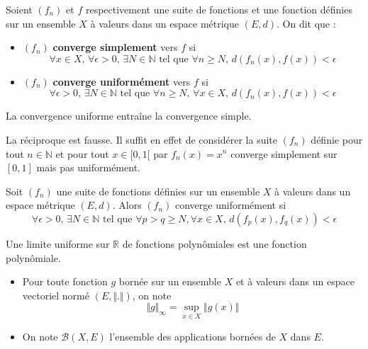   \begin{definition}
    Soient $(f_n)$ et $f$ respectivement une suite de fonctions et une fonction définies sur un ensemble $X$ à valeurs dans un espace métrique $(E, d)$. On dit que :
    \begin{itemize}
      \item $(f_n)$ \textbf{converge simplement} vers $f$ si
      \[ \forall x \in X, \, \forall \epsilon > 0, \, \exists N \in \mathbb{N} \text{ tel que } \forall n \geq N, \, d(f_n(x), f(x)) < \epsilon \]
      \item $(f_n)$ \textbf{converge uniformément} vers $f$ si
      \[ \forall \epsilon > 0, \, \exists N \in \mathbb{N} \text{ tel que } \forall n \geq N, \, \forall x \in X, \, d(f_n(x), f(x)) < \epsilon \]
    \end{itemize}
  \end{definition}

  \begin{proposition}
    La convergence uniforme entraîne la convergence simple.
  \end{proposition}

  \begin{cexample}
    La réciproque est fausse. Il suffit en effet de considérer la suite $(f_n)$ définie pour tout $n \in \mathbb{N}$ et pour tout $x \in [0,1[$ par $f_n(x) = x^n$ converge simplement sur $[0,1]$ mais pas uniformément.
  \end{cexample}

  \begin{theorem}
    Soit $(f_n)$ une suite de fonctions définies sur un ensemble $X$ à valeurs dans un espace métrique $(E, d)$. Alors $(f_n)$ converge uniformément si
    \[ \forall \epsilon > 0, \, \exists N \in \mathbb{N} \text{ tel que } \forall p > q \geq N, \forall x \in X, \, d(f_p(x), f_q(x)) < \epsilon \]
  \end{theorem}


  \begin{corollary}
    Une limite uniforme sur $\mathbb{R}$ de fonctions polynômiales est une fonction polynômiale.
  \end{corollary}


  \begin{notation}
    \begin{itemize}
      \item Pour toute fonction $g$ bornée sur un ensemble $X$ et à valeurs dans un espace vectoriel normé $(E, \Vert . \Vert)$, on note
      \[ \Vert g \Vert_\infty = \sup_{x \in X} \Vert g(x) \Vert \]
      \item On note $\mathcal{B}(X,E)$ l'ensemble des applications bornées de $X$ dans $E$.
    \end{itemize}
  \end{notation}

